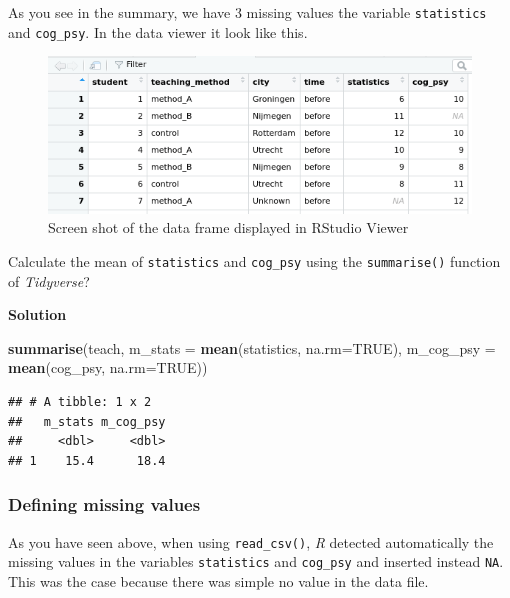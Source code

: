 \documentclass[
]{scrartcl}
\makeatletter
\newenvironment{Shaded}{\begin{snugshade}}{\end{snugshade}}
\newcommand{\DataTypeTok}[1]{\textcolor[rgb]{0.13,0.29,0.53}{#1}}
\newcommand{\KeywordTok}[1]{\textcolor[rgb]{0.13,0.29,0.53}{\textbf{#1}}}
\newcommand{\NormalTok}[1]{#1}
\newcommand{\OtherTok}[1]{\textcolor[rgb]{0.56,0.35,0.01}{#1}}
\newenvironment{kframe}{%
\medskip{}
\setlength{\fboxsep}{.8em}
 \def\at@end@of@kframe{}%
 \ifinner\ifhmode%
  \def\at@end@of@kframe{\end{minipage}}%
  \begin{minipage}{\columnwidth}%
 \fi\fi%
 \def\FrameCommand##1{\hskip\@totalleftmargin \hskip-\fboxsep
 \colorbox{shadecolor}{##1}\hskip-\fboxsep
     \hskip-\linewidth \hskip-\@totalleftmargin \hskip\columnwidth}%
 \MakeFramed {\advance\hsize-\width
   \@totalleftmargin\z@ \linewidth\hsize
   \@setminipage}}%
 {\par\unskip\endMakeFramed%
 \at@end@of@kframe}
\newenvironment{rmdblock}[1]
  {
  \begin{itemize}
  \renewcommand{\labelitemi}{
    \raisebox{-.7\height}[0pt][0pt]{
      {\setkeys{Gin}{width=3em,keepaspectratio}\texttt{[image: images/\#1]}}
    }
  }
  \setlength{\fboxsep}{1em}
  \begin{kframe}
  \item
  }
  {
  \end{kframe}
  \end{itemize}
  }
\newenvironment{myexercise}
    {\begin{rmdblock}{exercise_green}}
    {\end{rmdblock}}
\newenvironment{webexsolution}[1]
    {\par\tiny\textbf{#1}}
    {\par}
\newcommand{\webexhide}[1]{\begin{webexsolution}{#1}}
\newcommand{\webexunhide}{\end{webexsolution}}
\makeatother
\begin{document}
As you see in the summary, we have 3 missing values the variable \texttt{statistics} and \texttt{cog\_psy}. In the data viewer it look like this.

\begin{figure}

{\centering \includegraphics[width=500px]{images/missings_unknown} 

}

\caption{Screen shot of the data frame displayed in RStudio Viewer}\label{fig:missingsscreenshort}
\end{figure}

\begin{myexercise}
Calculate the mean of \texttt{statistics} and \texttt{cog\_psy} using
the \texttt{summarise()} function of \emph{Tidyverse}?
\end{myexercise}
\webexhide{Solution}

\begin{Shaded}
\begin{Highlighting}[]
\KeywordTok{summarise}\NormalTok{(teach, }\DataTypeTok{m\_stats =} \KeywordTok{mean}\NormalTok{(statistics, }\DataTypeTok{na.rm=}\OtherTok{TRUE}\NormalTok{),}
          \DataTypeTok{m\_cog\_psy =} \KeywordTok{mean}\NormalTok{(cog\_psy, }\DataTypeTok{na.rm=}\OtherTok{TRUE}\NormalTok{))}
\end{Highlighting}
\end{Shaded}

\begin{verbatim}
## # A tibble: 1 x 2
##   m_stats m_cog_psy
##     <dbl>     <dbl>
## 1    15.4      18.4
\end{verbatim}

\webexunhide

\hypertarget{defining-missing-values}{%
\subsubsection{Defining missing values}\label{defining-missing-values}}

As you have seen above, when using \texttt{read\_csv()}, \emph{R} detected automatically the missing values in the variables \texttt{statistics} and \texttt{cog\_psy} and inserted instead \texttt{NA}. This was the case because there was simple no value in the data file.
\end{document}

